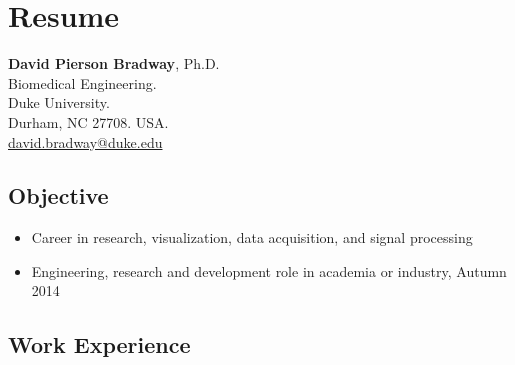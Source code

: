 \documentclass[]{article}
\begin{document}
\section{Resume}

\textbf{David Pierson Bradway}, Ph.D.\\Biomedical Engineering.\\Duke
University.\\Durham, NC 27708.
USA.\\\href{mailto:david.bradway@duke.edu}{david.bradway@duke.edu}

\subsection{Objective}

\begin{itemize}
\item
  Career in research, visualization, data acquisition, and signal
  processing
\item
  Engineering, research and development role in academia or industry,
  Autumn 2014
\end{itemize}
\subsection{Work Experience}
\end{document}
